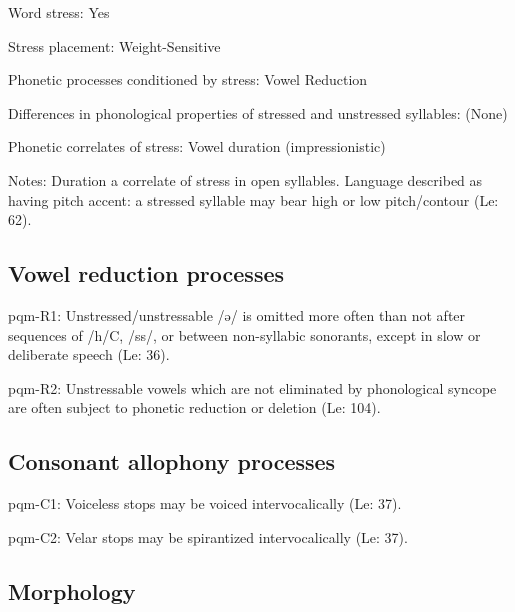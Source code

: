 {\begin{appendixdesc}
\item[Word stress:] Yes

\item[Stress placement:] Weight-Sensitive

\item[Phonetic processes conditioned by stress:] Vowel Reduction

\item[Differences in phonological properties of stressed and unstressed syllables:] (None)

\item[Phonetic correlates of stress:] Vowel duration (impressionistic)

\item[Notes:] Duration a correlate of stress in open syllables. Language described as having pitch accent: a stressed syllable may bear high or low pitch/contour (Le\citealt{Sourd1993}: 62).
\end{appendixdesc}
\subsection*{Vowel reduction processes}
\begin{appendixdesc}

\item[pqm-R1:] Unstressed/unstressable /ə/ is omitted more often than not after sequences of /h/C, /ss/, or between non-syllabic sonorants, except in slow or deliberate speech (Le\citealt{Sourd1993}: 36).

\item[pqm-R2:] Unstressable vowels which are not eliminated by phonological syncope are often subject to phonetic reduction or deletion (Le\citealt{Sourd1993}: 104).
\end{appendixdesc}
\subsection*{Consonant allophony processes}
\begin{appendixdesc}

\item[pqm-C1:] Voiceless stops may be voiced intervocalically (Le\citealt{Sourd1993}: 37).

\item[pqm-C2:] Velar stops may be spirantized intervocalically (Le\citealt{Sourd1993}: 37).
\end{appendixdesc}
\subsection*{Morphology}

}
